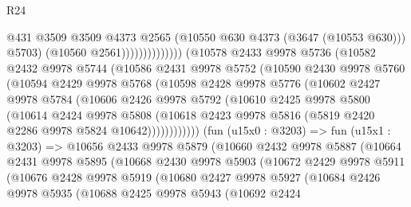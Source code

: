 \begin{lexlean}{R24}
\begin{coremodule}
                                    @431
                                    @3509
                                    @3509
                                    @4373
                                    @2565
                                    (@10550 @630 @4373 (@3647 (@10553 @630)))
                                    @5703)
                                  (@10560 @2561))))))))))))))
        (@10578
          @2433
          @9978
          @5736
          (@10582
            @2432
            @9978
            @5744
            (@10586
              @2431
              @9978
              @5752
              (@10590
                @2430
                @9978
                @5760
                (@10594
                  @2429
                  @9978
                  @5768
                  (@10598
                    @2428
                    @9978
                    @5776
                    (@10602
                      @2427
                      @9978
                      @5784
                      (@10606
                        @2426
                        @9978
                        @5792
                        (@10610
                          @2425
                          @9978
                          @5800
                          (@10614
                            @2424
                            @9978
                            @5808
                            (@10618
                              @2423
                              @9978
                              @5816
                              (@5819 @2420 @2286 @9978 @5824 @10642))))))))))))
        (fun (u15x0 : @3203) =>
        fun (u15x1 : @3203) =>
        @10656
          @2433
          @9978
          @5879
          (@10660
            @2432
            @9978
            @5887
            (@10664
              @2431
              @9978
              @5895
              (@10668
                @2430
                @9978
                @5903
                (@10672
                  @2429
                  @9978
                  @5911
                  (@10676
                    @2428
                    @9978
                    @5919
                    (@10680
                      @2427
                      @9978
                      @5927
                      (@10684
                        @2426
                        @9978
                        @5935
                        (@10688
                          @2425
                          @9978
                          @5943
                          (@10692
                            @2424

\end{coremodule}
\end{lexlean}

